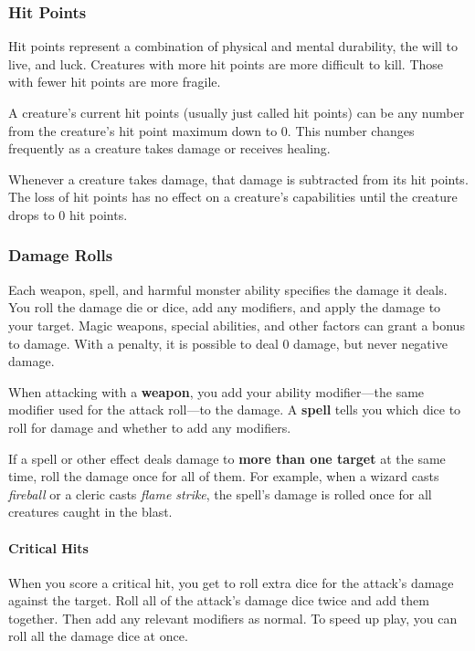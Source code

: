 \documentclass[
]{article}
\begin{document}
\hypertarget{hit-points}{%
\subsubsection{Hit Points}\label{hit-points}}

Hit points represent a combination of physical and mental durability,
the will to live, and luck. Creatures with more hit points are more
difficult to kill. Those with fewer hit points are more fragile.

A creature's current hit points (usually just called hit points) can be
any number from the creature's hit point maximum down to 0. This number
changes frequently as a creature takes damage or receives healing.

Whenever a creature takes damage, that damage is subtracted from its hit
points. The loss of hit points has no effect on a creature's
capabilities until the creature drops to 0 hit points.

\hypertarget{damage-rolls}{%
\subsubsection{Damage Rolls}\label{damage-rolls}}

Each weapon, spell, and harmful monster ability specifies the damage it
deals. You roll the damage die or dice, add any modifiers, and apply the
damage to your target. Magic weapons, special abilities, and other
factors can grant a bonus to damage. With a penalty, it is possible to
deal 0 damage, but never negative damage.

When attacking with a \textbf{weapon}, you add your ability
modifier---the same modifier used for the attack roll---to the damage. A
\textbf{spell} tells you which dice to roll for damage and whether to
add any modifiers.

If a spell or other effect deals damage to \textbf{more than one target}
at the same time, roll the damage once for all of them. For example,
when a wizard casts \emph{fireball} or a cleric casts \emph{flame
strike}, the spell's damage is rolled once for all creatures caught in
the blast.

\hypertarget{critical-hits}{%
\paragraph{Critical Hits}\label{critical-hits}}

When you score a critical hit, you get to roll extra dice for the
attack's damage against the target. Roll all of the attack's damage dice
twice and add them together. Then add any relevant modifiers as normal.
To speed up play, you can roll all the damage dice at once.
\end{document}
